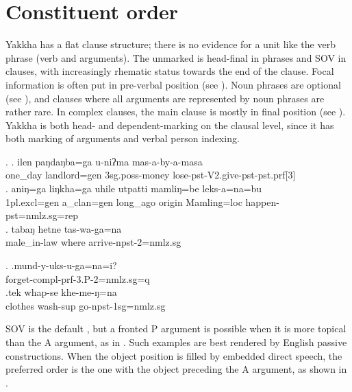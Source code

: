  
\section{Constituent order}\label{simp-cl2}

Yakkha has a flat clause structure; there is no evidence for  a unit like the verb phrase (verb and arguments). The unmarked  is head-final in phrases and SOV in clauses, with increasingly rhematic status towards the end of the clause. Focal information is often put in pre-verbal position (see \Next). Noun phrases are optional (see \NNext[a]), and clauses where all arguments are represented by noun phrases are rather rare. In complex clauses, the main clause is mostly in final position (see \NNext[b]). Yakkha is both head- and dependent-marking on the clausal level, since it has both  marking of arguments and verbal person indexing. 

\ex. \ag. ilen paŋdaŋba=ga    u-niʔma   mas-a-by-a-masa\\
 one\_day landlord{\sc =gen} {\sc 3sg.poss-}money lose{\sc -pst-V2.give-pst-pst.prf[3]}\\
 \bg.  aniŋ=ga         liŋkha=ga      uhile         utpatti mamliŋ=be      leks-a=na=bu\\
 	{\sc 1pl.excl=gen}  a\_clan{\sc =gen} long\_ago origin  Mamling{\sc =loc} happen{\sc -pst=nmlz.sg=rep}\\
 	 
 \bg. tabaŋ hetne tas-wa-ga=na\\
 	male\_in-law where arrive-{\sc npst-2=nmlz.sg}\\
 
 \ex. \ag.mund-y-uks-u-ga=na=i?\\
 forget{\sc -compl-prf-3.P-2=nmlz.sg=q}\\
 \bg.tek whap-se khe-me-ŋ=na\\
clothes wash{\sc -sup} go{\sc -npst-1sg=nmlz.sg}\\

 
SOV is the default , but a fronted P argument is possible when it is more topical than the A argument, as in  \Next[a]. Such examples are best rendered by English passive constructions. When the object position is filled by embedded direct speech, the preferred order is the one with the object preceding the A argument, as shown in \Next[b]. 


